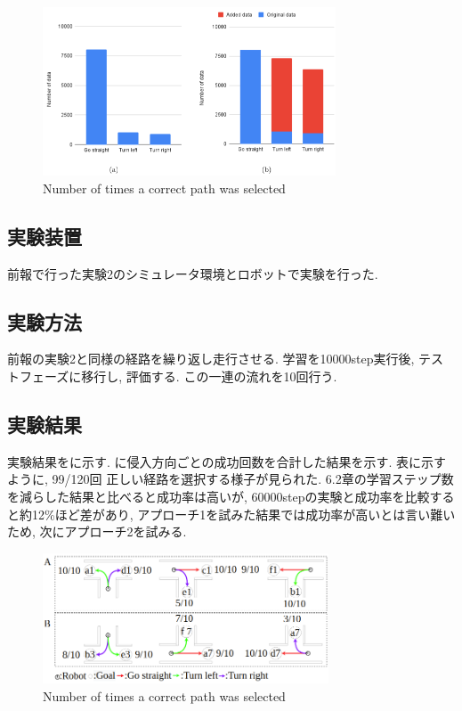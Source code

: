 \documentclass{jarticle}
\begin{document}
\begin{figure}[h]
  \centering
   \includegraphics[width=87mm]{hist.png}
   \vspace*{-4mm}
   \caption{Number of times a correct path was selected}
   \label{fig: fig10}
 \end{figure}

\subsection{実験装置}
前報\cite{mech}で行った実験2のシミュレータ環境とロボットで実験を行った.

\subsection{実験方法}
前報\cite{mech}の実験2と同様の経路を繰り返し走行させる. 学習を10000step実行後, テストフェーズに移行し, 評価する. この一連の流れを10回行う.

\subsection{実験結果}
実験結果をに示す. に侵入方向ごとの成功回数を合計した結果を示す. 表に示すように, 99/120回 正しい経路を選択する様子が見られた. 6.2章の学習ステップ数を減らした結果と比べると成功率は高いが, 60000stepの実験と成功率を比較すると約12\%ほど差があり, アプローチ1を試みた結果では成功率が高いとは言い難いため, 次にアプローチ2を試みる.

\begin{figure}[h]
  \centering
   \includegraphics[width=85mm]{10000step_act1.0.png}
   \vspace*{-4mm}
   \caption{Number of times a correct path was selected}
   \label{fig: fig11}
 \end{figure}
\end{document}
